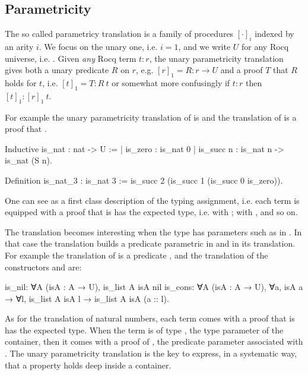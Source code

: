 \documentclass[a4paper, 11pt]{book}
\begin{document}
\subsection{Parametricity}\label{sec:param1}

The so called parametricy translation \cite{keller_et_al:LIPIcs.CSL.2012.381}
is a family of procedures $[\cdot]_i$ indexed by an arity $i$. We focus on the
unary one, i.e. $i=1$, and we write $U$ for any Rocq universe, i.e. .
Given \emph{any} Rocq term $t : r$, the unary parametricity
translation gives both a unary predicate $R$ on $r$, e.g. $[r]_1 = R : r \to U$
and a proof $T$ that $R$ holds for $t$, i.e. $[t]_1 = T : R~ t$ or somewhat more
confusingly if $t : r$ then $[t]_1 : [r]_1~ t$.

For example the unary parametricity translation of
 is  and
the translation of  is a proof that .

\begin{rocqcode}
Inductive is_nat : nat -> U :=
| is_zero : is_nat 0
| is_succ n : is_nat n -> is_nat (S n).

Definition is_nat_3 : is_nat 3 :=
  is_succ 2 (is_succ 1 (is_succ 0 is_zero)).
\end{rocqcode}

One can see  as a first class description of the
typing assignment, i.e. each term is equipped with a proof that
is has the expected type, i.e.  with ;
 with , and so on.

The translation becomes interesting when the type has parameters such as
 in . In that case the translation builds
a predicate parametric in  and in its translation. For example
the translation of  is a predicate
,
and the translation of the constructors  and 
are:
\begin{rocqcode}
is_nil: ∀A (isA : A → U), is_list A isA nil
is_cons: ∀A (isA : A → U), ∀a, isA a → 
  ∀l, is_list A isA l → is_list A isA (a :: l).
\end{rocqcode}

As for the translation of natural numbers, each term comes with a proof
that is has the expected type. When the term is of type ,
the type parameter of the container, then it comes with a proof of ,
the predicate parameter associated with .
The unary parametricity translation is the key to express, in a
systematic way, that a property holds deep inside a container.
\end{document}

